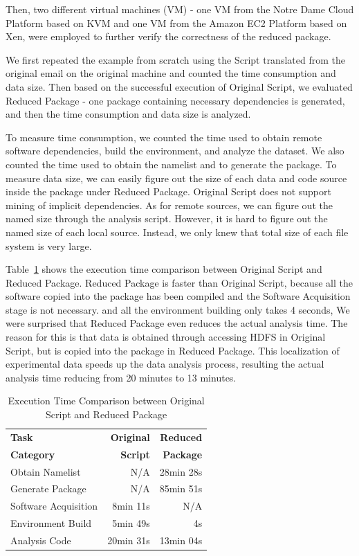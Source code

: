 \documentclass{sig-alternate}
\begin{document}
Then, two different virtual machines (VM) - one VM from the Notre Dame Cloud Platform based on KVM and one VM from the Amazon EC2 Platform based on Xen, were employed to further verify the correctness of the reduced package.

We first repeated the example from scratch using the Script translated from the original email on the original machine and counted the time consumption and data size. 
Then based on the successful execution of Original Script, we evaluated Reduced Package - one package containing necessary dependencies is generated, and then the time consumption and data size is analyzed. 

To measure time consumption, we counted the time used to obtain remote software dependencies, build the environment, and analyze the dataset. We also counted the time used to obtain the namelist and to generate the package. To measure data size, we can easily figure out the size of each data and code source inside the package under Reduced Package.
Original Script does not support mining of implicit dependencies. As for remote sources, we can figure out the named size through the analysis script. However, it is hard to figure out the named size of each local source. 
Instead, we only knew that total size of each file system is very large.

Table~\ref{table:time-2nd3rd} shows the execution time comparison between
Original Script and Reduced Package.
Reduced Package is faster than Original Script, because all the software copied into the package has been compiled and the Software Acquisition stage is not necessary.
and all the environment building only takes 4 seconds,
We were surprised that Reduced Package even reduces the actual analysis time. 
The reason for this is that data is obtained through accessing HDFS in Original Script, but is copied into the package in Reduced Package. This localization of experimental data speeds up the data analysis process, resulting the actual analysis time reducing from 20 minutes to 13 minutes.

\begin{table}
    \centering
    \begin{tabular}{|l|r|r|}
    \hline
    \bf Task & \bf Original& \bf Reduced\\ 
    \bf Category & \bf Script & \bf Package\\ \hline
    Obtain Namelist & N/A & 28min 28s \\ \hline
    Generate Package & N/A & 85min 51s \\ \hline
    Software Acquisition & 8min 11s & N/A \\ \hline
    Environment Build & 5min 49s  & 4s \\ \hline
    Analysis Code & 20min 31s & 13min 04s \\ \hline
    \end{tabular}
    \caption{Execution Time Comparison between Original Script and Reduced Package}
    \label{table:time-2nd3rd}
\end{table}    
\end{document}
